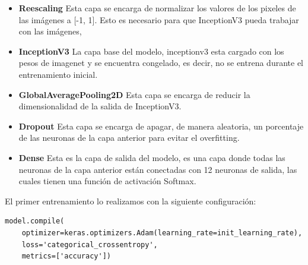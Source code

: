 \documentclass[12pt, titlepage, a4paper]{article}
\begin{document}
\begin{table}[H]
\centering
{}
\caption{Estructura del primer modelo}
\end{table}

\begin{itemize}
    \item \textbf{Reescaling} Esta capa se encarga de normalizar los valores de los pixeles de las imágenes a [-1, 1]. Esto es necesario para que InceptionV3 pueda trabajar con las imágenes,
    \item \textbf{InceptionV3} La capa base del modelo, inceptionv3 esta cargado con los pesos de imagenet y se encuentra congelado, es decir, no se entrena durante el entrenamiento inicial.
    \item \textbf{GlobalAveragePooling2D} Esta capa se encarga de reducir la dimensionalidad de la salida de InceptionV3.
    \item \textbf{Dropout} Esta capa se encarga de apagar, de manera aleatoria, un porcentaje de las neuronas de la capa anterior para evitar el overfitting.
    \item \textbf{Dense} Esta es la capa de salida del modelo, es una capa donde todas las neuronas de la capa anterior están conectadas con 12 neuronas de salida, las cuales tienen una función de activación Softmax.
\end{itemize}

\noindent El primer entrenamiento lo realizamos con la siguiente configuración:
\begin{verbatim}    
model.compile(
    optimizer=keras.optimizers.Adam(learning_rate=init_learning_rate),
    loss='categorical_crossentropy',
    metrics=['accuracy'])
\end{verbatim}
\end{document}
